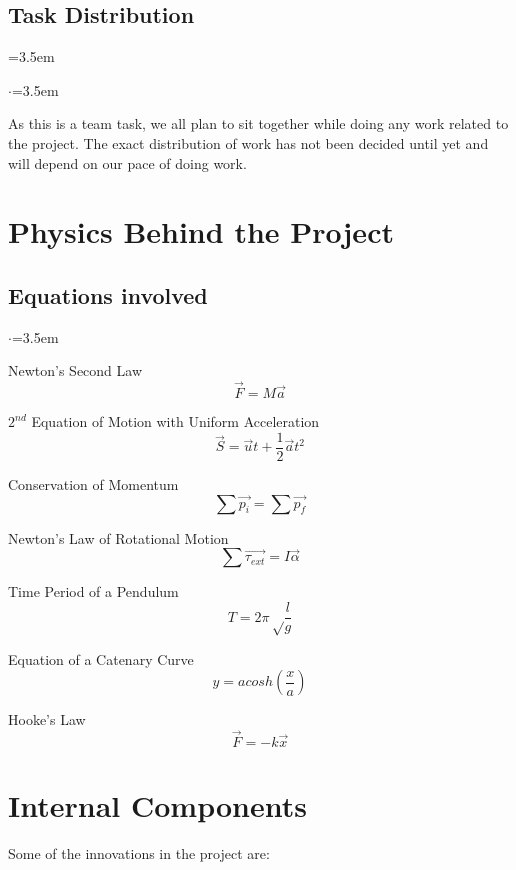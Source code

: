\documentclass[12pt,a4paper]{article}
\begin{document}
\subsection{Task Distribution}{\leftmargin=3.5em} \label{time}
\begin{list}{$\cdot$}{\leftmargin=3.5em}
\item As this is a team task, we all plan to sit together while doing any work related to the project. The exact distribution of work has not been decided until yet and will depend on our pace of doing work.
\end{list}
\pagebreak
\section{Physics Behind the Project} \label{phy}
\subsection{Equations involved}
\begin{list}{$\cdot$}{\leftmargin=3.5em}
\item Newton's Second Law $$\vec{F}=M\vec{a}$$ \label{second}
\item  \label{uni} $2^{nd}$ Equation of Motion with Uniform Acceleration $$\vec{S}= \vec{u}t + \frac{1}{2}\vec{a}t^2$$ 
\item Conservation of Momentum $$\sum\vec{p_i}=\sum\vec{p_f}$$ \label{mom}
\item Newton's Law of Rotational Motion $$\sum\vec{\tau_{ext}}=I\vec{\alpha}$$\label{rot}
\item Time Period of a Pendulum $$T=2\pi{\sqrt\frac{l}{g}}$$ \label{tp}
\item \label{eqn} Equation of a Catenary Curve $$y=a cosh{(\frac{x}{a})}$$ 
\item Hooke's Law $$\vec{F}=-k\vec{x}$$ \label{hooke}
\end{list}

\pagebreak
\section{Internal Components} \label{ic}
Some of the innovations in the project are: \\ 
\end{document}
